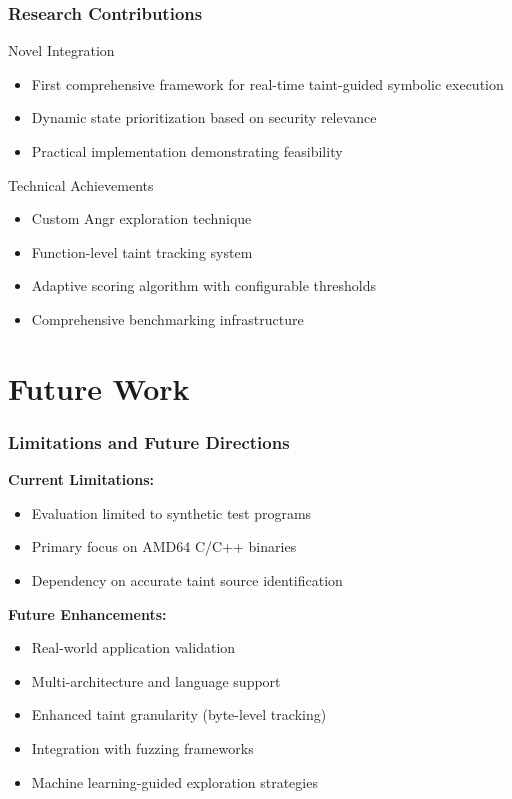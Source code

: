 \documentclass[aspectratio=169]{beamer}
\begin{document}
\begin{frame}
    \frametitle{Research Contributions}
    \begin{research}{Novel Integration}
        \begin{itemize}
            \item First comprehensive framework for real-time taint-guided symbolic execution
            \item Dynamic state prioritization based on security relevance
            \item Practical implementation demonstrating feasibility
        \end{itemize}
    \end{research}
    
    \begin{implementation}{Technical Achievements}
        \begin{itemize}
            \item Custom Angr exploration technique
            \item Function-level taint tracking system
            \item Adaptive scoring algorithm with configurable thresholds
            \item Comprehensive benchmarking infrastructure
        \end{itemize}
    \end{implementation}
\end{frame}

\section{Future Work}

\begin{frame}
    \frametitle{Limitations and Future Directions}
    \textbf{Current Limitations:}
    \begin{itemize}
        \item Evaluation limited to synthetic test programs
        \item Primary focus on AMD64 C/C++ binaries
        \item Dependency on accurate taint source identification
    \end{itemize}
    
    \vspace{1em}
    \textbf{Future Enhancements:}
    \begin{itemize}
        \item Real-world application validation
        \item Multi-architecture and language support
        \item Enhanced taint granularity (byte-level tracking)
        \item Integration with fuzzing frameworks
        \item Machine learning-guided exploration strategies
    \end{itemize}
\end{frame}
\end{document}
